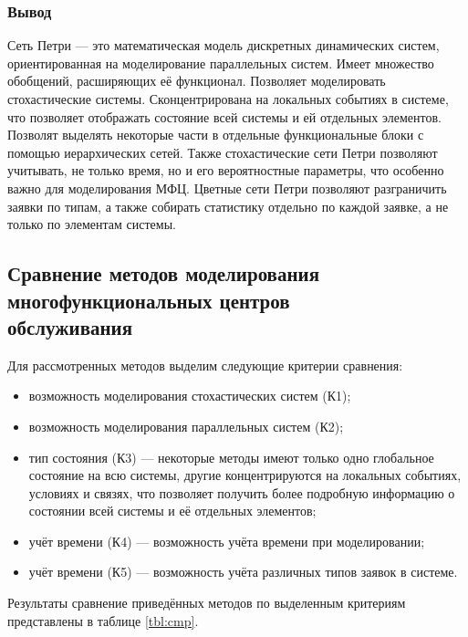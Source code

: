 \subsubsection{Вывод}

Сеть Петри --- это математическая модель дискретных динамических систем, ориентированная на моделирование параллельных систем. Имеет множество обобщений, расширяющих её функционал. Позволяет моделировать стохастические системы. Сконцентрирована на локальных событиях в системе, что позволяет отображать состояние  всей системы и ей отдельных элементов. Позволят выделять некоторые части в отдельные функциональные блоки с помощью иерархических сетей. Также стохастические сети Петри позволяют учитывать, не только время, но и его вероятностные параметры, что особенно важно для моделирования МФЦ. Цветные сети Петри позволяют разграничить заявки по типам, а также собирать статистику отдельно по каждой заявке, а не только по элементам системы.

\subsection[Сравнение методов моделирования\\многофункциональных центров обслуживания]{Сравнение методов моделирования\\многофункциональных центров\\обслуживания}

Для рассмотренных методов выделим следующие критерии сравнения:
\begin{itemize}[label=---]
	\item возможность моделирования стохастических систем (К1);
	\item возможность моделирования параллельных систем (К2);
	\item тип состояния (К3) --- некоторые методы имеют только одно глобальное состояние на всю системы, другие концентрируются на локальных событиях, условиях и связях, что позволяет получить более подробную информацию о состоянии всей системы и её отдельных элементов;
	\item учёт времени (К4) --- возможность учёта времени при моделировании;
	\item учёт времени (К5) --- возможность учёта различных типов заявок в системе.
\end{itemize}

Результаты сравнение приведённых методов по выделенным критериям представлены в таблице \ref{tbl:cmp}.

